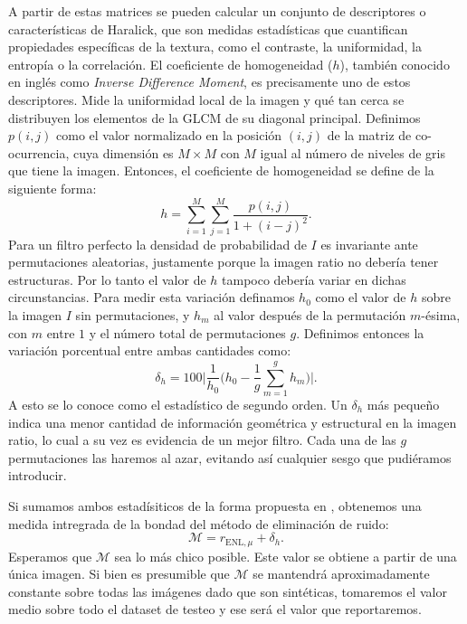A partir de estas matrices se pueden calcular un conjunto de descriptores o características de Haralick, que son medidas estadísticas que cuantifican propiedades específicas de la textura, como el contraste, la uniformidad, la entropía o la correlación. El coeficiente de homogeneidad ($h$), también conocido en inglés como \emph{Inverse Difference Moment}, es precisamente uno de estos descriptores. Mide la uniformidad local de la imagen y qué tan cerca se distribuyen los elementos de la GLCM de su diagonal principal. Definimos $p(i,j)$ como el valor normalizado en la posición $(i, j)$ de la matriz de co-ocurrencia, cuya dimensión es $M\times M$ con $M$ igual al número de niveles de gris que tiene la imagen. Entonces, el coeficiente de homogeneidad se define de la siguiente forma:
\begin{equation}
    h = \sum_{i=1}^{M}\sum_{j=1}^{M}\frac{p(i,j)}{1+(i-j)^2}.
\end{equation}
Para un filtro perfecto la densidad de probabilidad de $I$ es invariante ante permutaciones aleatorias, justamente porque la imagen ratio no debería tener estructuras. Por lo tanto el valor de $h$ tampoco debería variar en dichas circunstancias. Para medir esta variación definamos $h_0$ como el valor de $h$ sobre la imagen $I$ sin permutaciones, y $h_m$ al valor después de la permutación $m$-ésima, con $m$ entre $1$ y el número total de permutaciones $g$. Definimos entonces la variación porcentual entre ambas cantidades como:
\begin{equation}
    \delta_h = 100\Bigg| \frac{1}{h_0} \Bigg( h_0 - \frac{1}{g}\sum_{m=1}^{g} h_m \Bigg) \Bigg|.
\end{equation}
A esto se lo conoce como el estadístico de segundo orden. Un $\delta_h$ más pequeño indica una menor cantidad de información geométrica y estructural en la imagen ratio, lo cual a su vez es evidencia de un mejor filtro. Cada una de las $g$ permutaciones las haremos al azar, evitando así cualquier sesgo que pudiéramos introducir.

Si sumamos ambos estadísiticos de la forma propuesta en \cite{gomez2017unassisted}, obtenemos una medida intregrada de la bondad del método de eliminación de ruido:
\begin{equation}
    \mathcal{M} = r_{\text{ENL},\mu} + \delta_h.
\end{equation}
Esperamos que $\mathcal{M}$ sea lo más chico posible. Este valor se obtiene a partir de una única imagen. Si bien es presumible que $\mathcal{M}$ se mantendrá aproximadamente constante sobre todas las imágenes dado que son sintéticas, tomaremos el valor medio sobre todo el dataset de testeo y ese será el valor que reportaremos.

